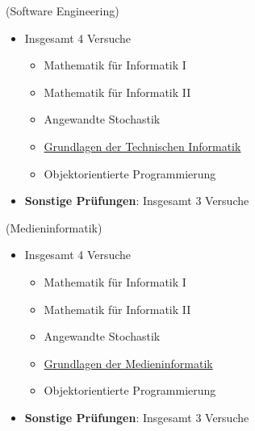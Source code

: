 \documentclass[
	aspectratio=169, 
	10pt 
]{beamer}
\begin{document}
\begin{frame}{\insertsubsection \space (Software Engineering)}
    \begin{itemize}
        \item Insgesamt 4 Versuche \footnotemark[1] \begin{itemize} 
            \item Mathematik für Informatik I
            \item Mathematik für Informatik II
            \item Angewandte Stochastik
            \item \underline{Grundlagen der Technischen Informatik}
            \item Objektorientierte Programmierung \end{itemize}
        \item \textbf{Sonstige Prüfungen}: Insgesamt 3 Versuche
    \end{itemize}

\end{frame}

\begin{frame}{\insertsubsection \space (Medieninformatik)}
    \begin{itemize}
        \item Insgesamt 4 Versuche \footnotemark[1] \begin{itemize} 
            \item Mathematik für Informatik I
            \item Mathematik für Informatik II
            \item Angewandte Stochastik
            \item \underline{Grundlagen der Medieninformatik}
            \item Objektorientierte Programmierung \end{itemize}
        \item \textbf{Sonstige Prüfungen}: Insgesamt 3 Versuche
    \end{itemize}

\end{frame}
\end{document}
